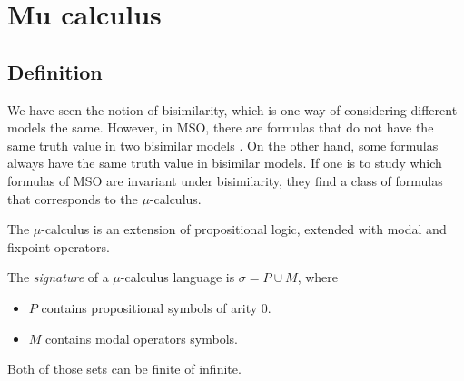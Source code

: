 
\section{Mu calculus}

\subsection{Definition}

We have seen the notion of bisimilarity, which is one way of considering
different models the same. However, in MSO, there are formulas
that do not have the same truth value in two bisimilar models
. On the other hand, some formulas always
have the same truth value in bisimilar models.
If one is to study which formulas of MSO are invariant under bisimilarity,
they find a class of formulas that corresponds to the $\mu$-calculus.

The $\mu$-calculus is an extension of propositional logic,
extended with modal and fixpoint operators.

\begin{definition}
    The \emph{signature} of a $\mu$-calculus language is
    $\sigma = P \cup M$, where
    \begin{itemize}
        \item $P$ contains propositional symbols of arity 0.
        \item $M$ contains modal operators symbols.
    \end{itemize}
    Both of those sets can be finite of infinite.
\end{definition}

